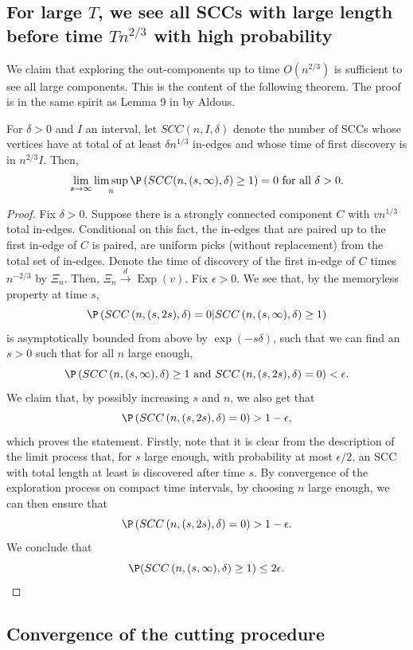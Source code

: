 \subsection{For large $T$, we see all SCCs with large length before time $Tn^{2/3}$ with high probability}
We claim that exploring the out-components up to time $O(n^{2/3})$ is sufficient to see all large components. This is the content of the following theorem. The proof is in the same spirit as Lemma 9 in \cite{Aldous1991} by Aldous. 
\begin{lemma}
For $\delta>0$ and $I$ an interval, let $SCC(n,I,\delta)$ denote the number of SCCs whose vertices have at total of at least $\delta n^{1/3}$ in-edges and whose time of first discovery is in $n^{2/3}I$. Then,
$$\lim_{s\to \infty}\limsup_{n} \P\left(SCC(n,(s,\infty),\delta)\geq 1\right)=0\text{ for all }\delta>0.$$
\end{lemma}
\begin{proof}
Fix $\delta>0$. Suppose there is a strongly connected component $C$ with $vn^{1/3}$ total in-edges. Conditional on this fact, the in-edges that are paired up to the first in-edge of $C$ is paired, are uniform picks (without replacement) from the total set of in-edges. Denote the time of discovery of the first in-edge of $C$ times $n^{-2/3}$ by $\Xi_n$. Then, $\Xi_n\overset{d}{\to}\operatorname{Exp}(v)$. Fix $\epsilon>0$. We see that, by the memoryless property at time $s$,
$$\P\left(SCC\left(n,(s,2s),\delta\right)=0|SCC\left(n,(s,\infty),\delta\right)\geq 1\right)$$
is asymptotically bounded from above by 
$\exp(-s\delta)$, such that we can find an $s>0$ such that for all $n$ large enough,
$$\P\left(SCC\left(n,(s,\infty),\delta\right)\geq 1 \text{ and }SCC\left(n,(s,2s),\delta\right)=0\right)<\epsilon.$$
We claim that, by possibly increasing $s$ and $n$, we also get that 
$$\P\left(SCC\left(n,(s,2s),\delta\right)=0\right)>1-\epsilon,$$
which proves the statement.
Firstly, note that it is clear from the description of the limit process that, for $s$ large enough, with probability at most $\epsilon/2$, an SCC with total length at least  is discovered after time $s$. By convergence of the exploration process on compact time intervals, by choosing $n$ large enough, we can then ensure that 
$$\P\left(SCC\left(n,(s,2s),\delta\right)=0\right)>1-\epsilon.$$
We conclude that 
$$\P(SCC\left(n,(s,\infty),\delta\right)\geq 1)\leq 2\epsilon.$$
\end{proof}
\subsection{Convergence of the cutting procedure}